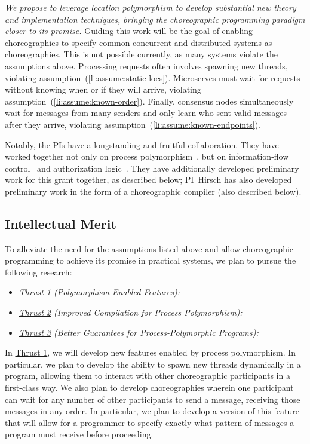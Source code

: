 \emph{We propose to leverage location polymorphism to develop substantial new theory and implementation techniques, bringing the choreographic programming paradigm closer to its promise.}
Guiding this work will be the goal of enabling choreographies to specify common concurrent and distributed systems as choreographies.
This is not possible currently, as many systems violate the assumptions above.
Processing requests often involves spawning new threads, violating assumption~(\ref{li:assume:static-locs}).
Microserves must wait for requests without knowing when or if they will arrive, violating assumption~(\ref{li:assume:known-order}).
Finally, consensus nodes simultaneously wait for messages from many senders
and only learn who sent valid messages after they arrive,
violating assumption~(\ref{li:assume:known-endpoints}).

Notably, the PIs have a longstanding and fruitful collaboration.
They have worked together not only on process polymorphism~\cite{SamuelsonHC25}, but on information-flow control~\cite{SilverHCHZ23,HirschC21} and authorization logic~\cite{HirschACAT20}.
They have additionally developed preliminary work for this grant together, as described below; PI~Hirsch has also developed preliminary work in the form of a choreographic compiler (also described below).

\subsection{Intellectual Merit}

To alleviate the need for the assumptions listed above and allow choreographic programming to achieve its promise in practical systems, we plan to pursue the following research:
\begin{itemize}
  \item \textit{\hyperref[sec:t1]{Thrust 1} (Polymorphism-Enabled Features):}
  \item \textit{\hyperref[sec:t2]{Thrust 2} (Improved Compilation for Process Polymorphism):}
  \item \textit{\hyperref[sec:t3]{Thrust 3} (Better Guarantees for Process-Polymorphic Programs):}
\end{itemize}


In \hyperref[sec:t1]{Thrust 1}, we will develop new features enabled by process polymorphism.
In particular, we plan to develop the ability to spawn new threads dynamically in a program, allowing them to interact with other choreographic participants in a first-class way.
We also plan to develop choreographies wherein one participant can wait for any number of other participants to send a message, receiving those messages in any order.
In particular, we plan to develop a version of this feature that will allow for a programmer to specify exactly what pattern of messages a program must receive before proceeding.

